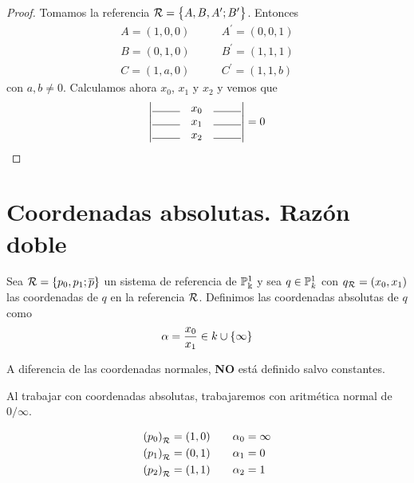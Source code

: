 \begin{proof}
Tomamos la referencia $\mathcal{R} = \left\{A,B,A^\prime;B^\prime\right\}$. Entonces
\[
\begin{aligned}
A = (1,0,0) &\qquad A^\prime = (0,0,1) \\
B = (0,1,0) &\qquad B^\prime = (1,1,1) \\
C = (1,a,0) &\qquad C^\prime = (1,1,b)
\end{aligned}
\]
con $a,b \neq 0$. Calculamos ahora $x_0$, $x_1$ y $x_
2$ y vemos que
\[
  \determinant{\line(1,0){25} & x_0 & \line(1,0){25} \\
    \line(1,0){25} & x_1 & \line(1,0){25} \\ \line(1,0){25} & x_2 & \line(1,0){25}} = 0
\]
\end{proof}


\section{Coordenadas absolutas. Razón doble}

\begin{defi}
  Sea $\mathcal{R} = \left\{p_0,p_1;\overline{p}\right\}$ un sistema de referencia de $\mathbb{P}^1_\Bbbk$ y
  sea $q \in \mathbb{P}^1_k$ con $q_{\mathcal{R}} = (x_0,x_1)$ las coordenadas de $q$ en la
  referencia $\mathcal{R}$. Definimos las coordenadas absolutas de $q$ como
  \[
    \alpha = \frac{x_0}{x_1} \in k \cup \left\{\infty\right\}
  \]
\end{defi}

\begin{obs}
  A diferencia de las coordenadas normales, \textbf{NO} está definido salvo constantes.
\end{obs}
\begin{obs}
  Al trabajar con coordenadas absolutas, trabajaremos con aritmética normal de $0/\infty$.
\end{obs}
\begin{obs}
  \[
    \begin{aligned}
      \left( p_0 \right)_{\mathcal{R}} = (1,0) &\qquad \alpha_0 = \infty \\
      \left( p_1 \right)_{\mathcal{R}} = (0,1) &\qquad \alpha_1 = 0 \\
      \left( p_2 \right)_{\mathcal{R}} = (1,1) &\qquad \alpha_2 = 1 \\
    \end{aligned}
  \]
\end{obs}

